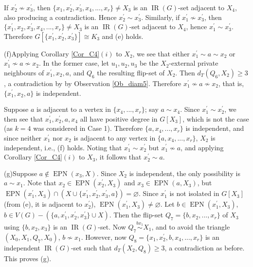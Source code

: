 \documentclass[12pt]{article}%
\begin{document}
If $x_{2}^{\prime}\nsim x_{3}^{\prime}$, then $\{x_{1},x_{2}^{\prime}%
,x_{3}^{\prime},x_{4},...,x_{r}\}\neq X_{3}$ is an $\operatorname{IR}(G)$-set
adjacent to $X_{4}$, also producing a contradiction. Hence $x_{2}^{\prime}\sim
x_{3}^{\prime}$. Similarly, if $x_{1}^{\prime}\nsim x_{3}^{\prime}$, then
$\{x_{1}^{\prime},x_{2},x_{3}^{\prime},x_{4},...,x_{r}\}\neq X_{3}$ is an
$\operatorname{IR}(G)$-set adjacent to $X_{4}$, hence $x_{1}^{\prime}\sim
x_{3}^{\prime}$. Therefore $G[\{x_{1}^{\prime},x_{2}^{\prime},x_{3}^{\prime
}\}]\cong K_{3}$ and (e) holds.\smallskip

\noindent(f)\hspace{0.1in}Applying Corollary \ref{Cor_C4}$(i)$ to $X_{2}$, we
see that either $x_{1}^{\prime}\sim a\sim x_{2}$ or $x_{1}^{\prime}\nsim
a\nsim x_{2}$. In the former case, let $u_{1},u_{2},u_{3}$ be the $X_{2}%
$-external private neighbours of $x_{1}^{\prime},x_{2},a$, and $Q_{6}$ the
resulting flip-set of $X_{2}$. Then $d_{T}(Q_{6},X_{2})\geq3$, a contradiction
by by Observation \ref{Ob_diam5}. Therefore $x_{1}^{\prime}\nsim a\nsim x_{2}%
$, that is, $\{x_{1}^{\prime},x_{2},a\}$ is independent.

Suppose $a$ is adjacent to a vertex in $\{x_{4},...,x_{r}\}$; say $a\sim
x_{4}$. Since $x_{1}^{\prime}\sim x_{2}^{\prime}$, we then see that
$x_{1}^{\prime},x_{2}^{\prime},a,x_{4}$ all have positive degree in $G[X_{3}%
]$, which is not the case (as $k=4$ was considered in Case 1). Therefore
$\{a,x_{4},...,x_{r}\}$ is independent, and since neither $x_{1}^{\prime}$ nor
$x_{2}$ is adjacent to any vertex in $\{a,x_{4},...,x_{r}\}$, $X_{2}$ is
independent, i.e., (f) holds. Noting that $x_{1}^{\prime}\sim x_{2}^{\prime}$
but $x_{1}^{\prime}\nsim a$, and applying Corollary \ref{Cor_C4}$(i)$ to
$X_{3}$, it follows that $x_{2}^{\prime}\sim a$.\smallskip\ 

\noindent(g)\hspace{0.1in}Suppose $a\notin\operatorname{EPN}(x_{3},X)$. Since
$X_{2}$ is independent, the only possibility is $a\sim x_{1}$. Note that
$x_{2}\in\operatorname{EPN}(x_{2}^{\prime},X_{3})$ and $x_{3}\in
\operatorname{EPN}(a,X_{3})$, but $\operatorname{EPN}(x_{1}^{\prime}%
,X_{3})\cap(X\cup\{x_{1}^{\prime},x_{2}^{\prime},x_{3}^{\prime}%
,a\})=\varnothing$. Since $x_{1}^{\prime}$ is not isolated in $G[X_{3}]$ (from
(e), it is adjacent to $x_{2}^{\prime}$), $\operatorname{EPN}(x_{1}^{\prime
},X_{3})\neq\varnothing$. Let $b\in\operatorname{EPN}(x_{1}^{\prime},X_{3})$,
$b\in V(G)-(\{a,x_{1}^{\prime},x_{2}^{\prime},x_{3}^{\prime}\}\cup X)$. Then
the flip-set $Q_{7}=\{b,x_{2},...,x_{r}\}$ of $X_{3}$ using $\{b,x_{2}%
,x_{3}\}$ is an $\operatorname{IR}(G)$-set. Now $Q_{7}\overset{bx_{1}}{\sim
}X_{1}$, and to avoid the triangle $(X_{0},X_{1},Q_{7},X_{0})$, $b\nsim x_{1}%
$. However, now $Q_{8}=\{x_{1},x_{2}^{\prime},b,x_{4},...,x_{r}\}$ is an
independent $\operatorname{IR}(G)$-set such that $d_{T}(X_{2},Q_{8})\geq3$, a
contradiction as before. This proves (g).\smallskip
\end{document}
